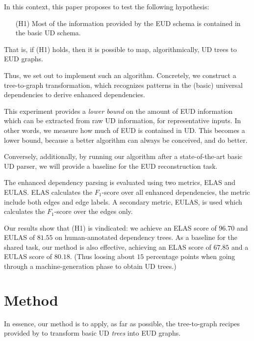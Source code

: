 \documentclass[11pt,a4paper]{article}
\begin{document}
In this context, this paper proposes to test the following hypothesis:
\begin{enumerate}
\item[(H1)] Most of the information provided by the EUD schema is
  contained in the basic UD schema.
\end{enumerate}

That is, if (H1) holds, then it is possible to map, algorithmically,
UD trees to EUD graphs.

Thus, we set out to implement such an algorithm. Concretely, we construct  a
tree-to-graph transformation, which recognizes patterns in the (basic)
universal dependencies to derive enhanced dependencies.
%


This experiment provides a \emph{lower bound} on the amount of EUD
information which can be extracted from raw UD information, for
representative inputs.  In other words, we measure how much of EUD is
contained in UD. This becomes a lower bound, because a better algorithm
can always be conceived, and do better.


Conversely, additionally, by running our algorithm after a
state-of-the-art basic UD parser, we will provide a baseline for the
EUD reconstruction task.
%
%

The enhanced dependency parsing is evaluated using two metrics,
ELAS and EULAS. ELAS calculates the $F_1$-score over all enhanced
dependencies, the metric include both edges and edge labels. A
secondary metric, EULAS, is used which calculates the $F_1$-score
over the edges only.

Our results show that (H1) is vindicated: we achieve an ELAS score of
$96.70$ and EULAS of $81.55$ on human-annotated dependency trees.  As
a baseline for the shared task, our method is also effective,
achieving an ELAS score of $67.85$ and a EULAS score of
$80.18$. (Thus loosing about $15$ percentage points when going through
a machine-generation phase to obtain UD trees.)

\section{Method}
In essence, our method is to apply, as far as possible, the
tree-to-graph recipes provided by \citet{schuster2016enhanced} to
transform basic UD \emph{trees} into EUD graphs.
\end{document}
